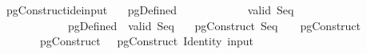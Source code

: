 \isamarkupfalse%
\ pgConstruct{\isacharunderscore}ide{\isacharunderscore}input{\isacharcolon}\isanewline
\ \ \ {\isachardoublequoteopen}pgDefined\ \isanewline
\ \ \ \ \ \ \ \ \ \ \ {\isachardoublequoteopen}valid\ {\isacharparenleft}Seq\ \isanewline
\ \ \ \ \ \ \ \ \ \ \ {\isachardoublequoteopen}{\isasymAnd}\ {\isasymlbrakk}pgDefined\ \ valid\ {\isacharparenleft}Seq\ \ \isanewline
{}\ pgConstruct\ {\isacharparenleft}Seq\ \ \ {\isasymapprox}\ pgConstruct\ \isanewline
\ \ \ \ \ \ \ {\isachardoublequoteopen}pgConstruct\ \ {\isasymapprox}\ pgConstruct\ {\isacharparenleft}Identity\ {\isacharparenleft}input\ 

